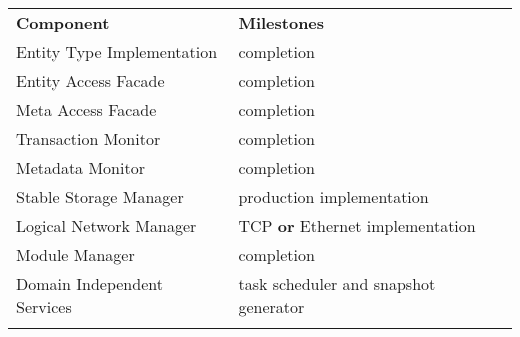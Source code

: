 \documentclass[a4paper, 10pt]{book}
\begin{document}
                                        \begin{center}\begin{footnotesize}\begin{tabular}{||l|l||} \hhline{|t:==:t|}
                                            \textbf{Component}          & \textbf{Milestones}                            %
                                            \\ \hhline{|:==:|} 
                                            Entity Type Implementation  & completion                                     %
                                            \\ \hhline{||--||}
                                            Entity Access Facade        & completion                                     %
                                            \\ \hhline{||--||}
                                            Meta Access Facade          & completion                           %
                                            \\ \hhline{||--||}
                                            Transaction Monitor         & completion                                  %
                                            \\ \hhline{||--||}
                                            Metadata Monitor            & completion                                  %
                                            \\ \hhline{||--||}
                                            Stable Storage Manager      & production implementation              %
                                            \\ \hhline{||--||}
                                            Logical Network Manager     & TCP \textbf{or} Ethernet implementation          %
                                            \\ \hhline{||--||}
                                            Module Manager              & completion                                     %
                                            \\ \hhline{||--||}
                                            Domain Independent Services & task scheduler and snapshot generator  %
                                            \\ \hhline{|b:==:b|}
                                        \end{tabular}\end{footnotesize}\end{center}
\end{document}
